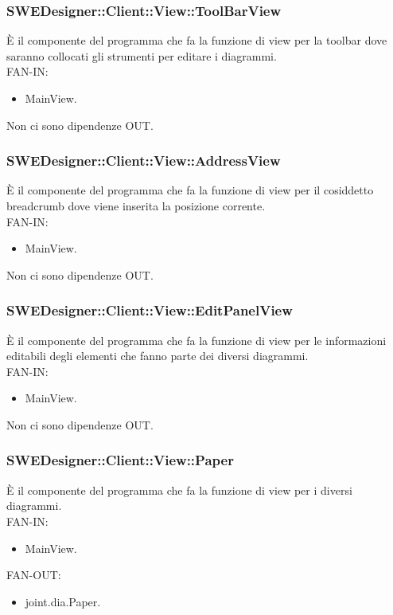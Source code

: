 \documentclass[../PianoDiQualifica.tex]{subfiles}
\begin{document}
		\subsubsection{SWEDesigner::Client::View::ToolBarView}
		È il componente del programma che fa la funzione di view per la toolbar dove saranno collocati gli strumenti per editare i diagrammi.\\
		FAN-IN:
		\begin{itemize}
			\item MainView.
		\end{itemize}
		Non ci sono dipendenze OUT.\\
		\subsubsection{SWEDesigner::Client::View::AddressView}
		È il componente del programma che fa la funzione di view per il cosiddetto breadcrumb dove viene inserita la posizione corrente.\\
		FAN-IN:
		\begin{itemize}
			\item MainView.
		\end{itemize}
		Non ci sono dipendenze OUT.\\
		\subsubsection{SWEDesigner::Client::View::EditPanelView}
		È il componente del programma che fa la funzione di view per le informazioni editabili degli elementi che fanno parte dei diversi diagrammi.\\
		FAN-IN:
		\begin{itemize}
			\item MainView.
		\end{itemize}
		Non ci sono dipendenze OUT.\\
		\subsubsection{SWEDesigner::Client::View::Paper}
		È il componente del programma che fa la funzione di view per i diversi diagrammi.\\
		FAN-IN:
		\begin{itemize}
			\item MainView.
		\end{itemize}
		FAN-OUT:
		\begin{itemize}
			\item joint.dia.Paper.
		\end{itemize}
\end{document}
